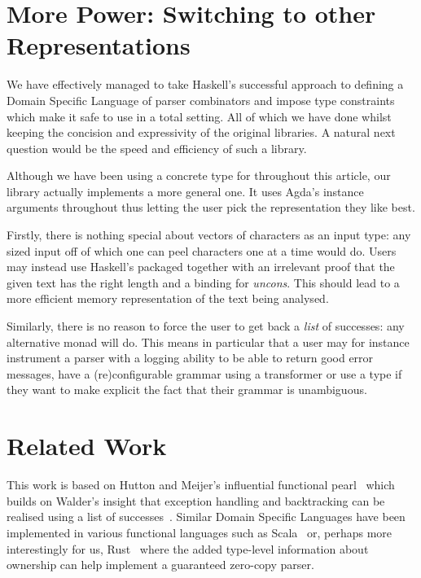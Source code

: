 \section{More Power: Switching to other Representations}

We have effectively managed to take Haskell's successful approach to defining
a Domain Specific Language of parser combinators and impose type constraints
which make it safe to use in a total setting. All of which we have done whilst
keeping the concision and expressivity of the original libraries. A natural
next question would be the speed and efficiency of such a library.

Although we have been using a concrete type for  throughout
this article, our library actually implements a more general one. It uses
Agda's instance arguments throughout thus letting the user pick the
representation they like best.

Firstly, there is nothing special about vectors of characters as an input
type: any sized input off of which one can peel characters one at a time
would do. Users may instead use Haskell's  packaged together
with an irrelevant proof that the given text has the right length and a
binding for \textit{uncons}. This should lead to a more efficient memory
representation of the text being analysed.

Similarly, there is no reason to force the user to get back a \emph{list}
of successes: any alternative monad will do. This means in particular that
a user may for instance instrument a parser with a logging ability to be
able to return good error messages, have a (re)configurable grammar using
a  transformer or use a  type if they want to make
explicit the fact that their grammar is unambiguous.

\section{Related Work}

This work is based on Hutton and Meijer's influential functional pearl~\citeyear{hutton1998monadic}
which builds on Walder's insight that exception handling and backtracking can be
realised using a list of successes~\citeyear{wadler1985replace}. Similar Domain
Specific Languages have been implemented in various functional languages such as
Scala~\cite{moors2008parser} or, perhaps more interestingly for us, Rust~\cite{couprie2015nom}
where the added type-level information about ownership can help implement a
guaranteed zero-copy parser.

